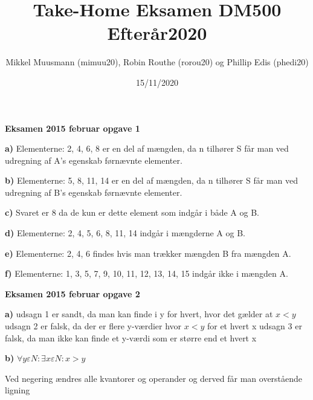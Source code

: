 \documentclass{article}
\title{\textbf{Take-Home Eksamen DM500 Efterår2020}}
\author{Mikkel Muusmann (mimuu20), Robin Routhe (rorou20) og Phillip Edis (phedi20)}
\date{15/11/2020}
\begin{document}
\maketitle

\textbf{Eksamen 2015 februar opgave 1}

\textbf{a)}
Elementerne: 2, 4, 6, 8 er en del af mængden, da n tilhører S får man ved udregning af A's egenskab førnævnte elementer.


\vspace{5mm} %

\textbf{b)}
Elementerne: 5, 8, 11, 14 er en del af mængden, da n tilhører S får man ved udregning af B's egenskab førnævnte elementer.


\vspace{5mm} %

\textbf{c)}
Svaret er 8 da de kun er dette element som indgår i både A og B.

\vspace{5mm} %

\textbf{d)}
Elementerne: 2, 4, 5, 6, 8, 11, 14 indgår i mængderne A og B.

\vspace{5mm} %

\textbf{e)}
Elementerne: 2, 4, 6 findes hvis man trækker mængden B fra mængden A.

\vspace{5mm} %

\textbf{f)}
Elementerne: 1, 3, 5, 7, 9, 10, 11, 12, 13, 14, 15 indgår ikke i mængden A.

\vspace{5mm} %
	
\textbf{Eksamen 2015 februar opgave 2}

\textbf{a)}
	udsagn 1 er sandt, da man kan finde i y for hvert, hvor det gælder at $x<y$
	udsagn 2 er falsk, da der er flere y-værdier hvor $x<y$ for et hvert x
	udsagn 3 er falsk, da man ikke kan finde et y-værdi som er større end et hvert x

\vspace{5mm} %

\textbf{b)}
	$\forall y \varepsilon N: \exists x \varepsilon N: x > y$

Ved negering ændres alle kvantorer og  operander og derved får man overstående ligning


\vspace{5mm} %
\end{document}
